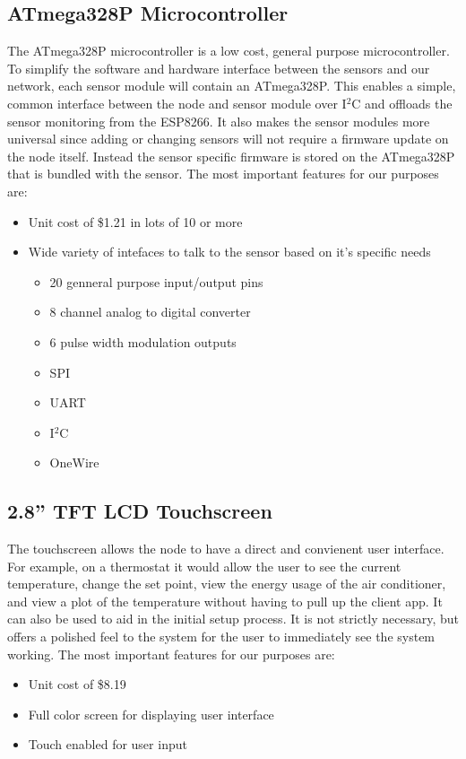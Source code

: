 		\subsection{ATmega328P Microcontroller}
			The ATmega328P microcontroller is a low cost, general purpose microcontroller. To simplify the software and hardware interface between the sensors and our network, each sensor module will contain an ATmega328P. This enables a simple, common interface between the node and sensor module over I$^2$C and offloads the sensor monitoring from the ESP8266. It also makes the sensor modules more universal since adding or changing sensors will not require a firmware update on the node itself. Instead the sensor specific firmware is stored on the ATmega328P that is bundled with the sensor. The most important features for our purposes are:
			\begin{itemize}
				\item Unit cost of \$1.21 in lots of 10 or more
				\item Wide variety of intefaces to talk to the sensor based on it's specific needs
				\begin{itemize}
					\item 20 genneral purpose input/output pins
					\item 8 channel analog to digital converter
					\item 6 pulse width modulation outputs
					\item SPI
					\item UART
					\item I$^2$C
					\item OneWire
				\end{itemize}
			\end{itemize}
		
		\subsection{2.8'' TFT LCD Touchscreen}
		The touchscreen allows the node to have a direct and convienent user interface. For example, on a thermostat it would allow the user to see the current temperature, change the set point, view the energy usage of the air conditioner, and view a plot of the temperature without having to pull up the client app. It can also be used to aid in the initial setup process. It is not strictly necessary, but offers a polished feel to the system for the user to immediately see the system working. The most important features for our purposes are:
		\begin{itemize}
			\item Unit cost of \$8.19
			\item Full color screen for displaying user interface
			\item Touch enabled for user input
		\end{itemize}
		
